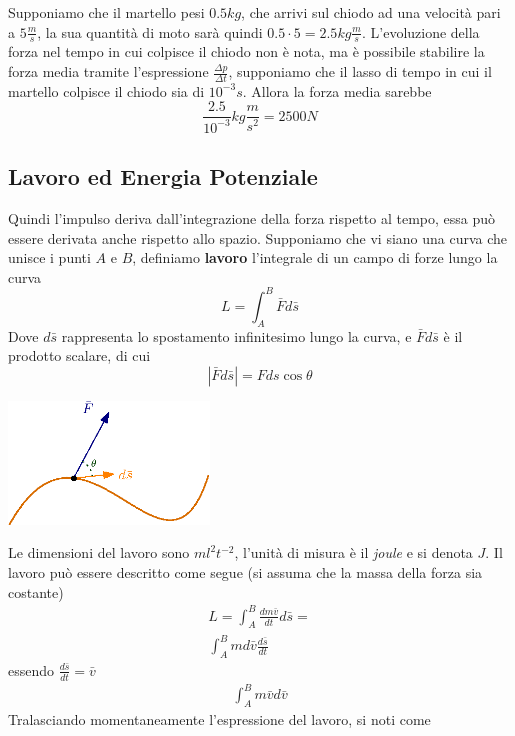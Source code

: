 \documentclass[10pt, letterpaper]{report}
\begin{document}
Supponiamo che il martello pesi $0.5kg$, che arrivi sul chiodo ad una velocità pari a $5\frac{m}{s}$, la sua quantità 
di moto sarà quindi $0.5\cdot 5=2.5kg\frac{m}{s}$. L'evoluzione della forza nel tempo in cui colpisce il chiodo non è 
nota, ma è possibile stabilire la forza media tramite l'espressione $\frac{\Delta p}{\Delta t}$, supponiamo che 
il lasso di tempo in cui il martello colpisce il chiodo sia di $10^{-3}s$. Allora la forza media sarebbe 
$$ \frac{2.5}{10^{-3}}kg\frac{m}{s^2}=2500N$$
\subsection{Lavoro ed Energia Potenziale}
Quindi l'impulso deriva dall'integrazione della forza rispetto al 
tempo, essa può essere derivata anche rispetto allo spazio.
Supponiamo che vi siano una curva che unisce i punti $A$ e $B$, 
definiamo \textbf{lavoro} l'integrale di un campo di forze lungo la curva
$$ L=\int_A^B\bar Fd\bar s$$
Dove $d\bar s$ rappresenta lo spostamento infinitesimo lungo la curva, e 
$\bar Fd\bar s$ è il prodotto scalare, di cui 
$$ |\bar Fd\bar s|=Fds\cos\theta$$\begin{center}
    \includegraphics[width=0.4\textwidth]{images/lavoro.eps}
\end{center}
Le dimensioni del lavoro sono $ml^2t^{-2}$, l'unità di misura 
è il \textit{joule} e si denota $J$. Il lavoro può 
essere descritto come segue (si assuma che la massa della forza 
sia costante) 
\begin{eqnarray}
    L=\int_A^B\frac{dm\bar v}{dt}d\bar s = \\ 
    \int_A^Bmd\bar v\frac{d\bar s}{dt}
\end{eqnarray}
essendo $\frac{d\bar s}{dt}=\bar v$
\begin{eqnarray}
    \int_A^Bm\bar vd\bar v
\end{eqnarray}
Tralasciando momentaneamente l'espressione del lavoro, si noti come 
\end{document}
